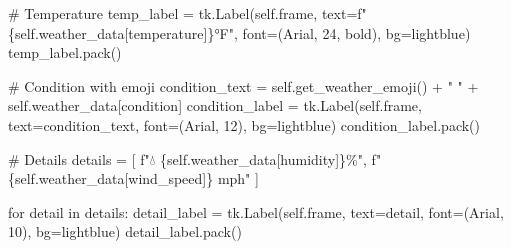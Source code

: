 \documentclass[
  letterpaper,
  DIV=11,
  numbers=noendperiod,
  oneside]{scrreprt}
\newenvironment{Shaded}{}{}
\newcommand{\CommentTok}[1]{\textcolor[rgb]{0.42,0.45,0.49}{#1}}
\newcommand{\ControlFlowTok}[1]{\textcolor[rgb]{0.84,0.23,0.29}{#1}}
\newcommand{\DecValTok}[1]{\textcolor[rgb]{0.00,0.36,0.77}{#1}}
\newcommand{\KeywordTok}[1]{\textcolor[rgb]{0.84,0.23,0.29}{#1}}
\newcommand{\NormalTok}[1]{\textcolor[rgb]{0.14,0.16,0.18}{#1}}
\newcommand{\OperatorTok}[1]{\textcolor[rgb]{0.14,0.16,0.18}{#1}}
\newcommand{\SpecialCharTok}[1]{\textcolor[rgb]{0.00,0.36,0.77}{#1}}
\newcommand{\SpecialStringTok}[1]{\textcolor[rgb]{0.01,0.18,0.38}{#1}}
\newcommand{\StringTok}[1]{\textcolor[rgb]{0.01,0.18,0.38}{#1}}
\newcommand{\VariableTok}[1]{\textcolor[rgb]{0.89,0.38,0.04}{#1}}
\begin{document}
\begin{Shaded}
\begin{Highlighting}[]
        \CommentTok{\# Temperature}
\NormalTok{        temp\_label }\OperatorTok{=}\NormalTok{ tk.Label(}\VariableTok{self}\NormalTok{.frame,}
\NormalTok{                             text}\OperatorTok{=}\SpecialStringTok{f"}\SpecialCharTok{\{}\VariableTok{self}\SpecialCharTok{.}\NormalTok{weather\_data[}\StringTok{\textquotesingle{}temperature\textquotesingle{}}\NormalTok{]}\SpecialCharTok{\}}\SpecialStringTok{°F"}\NormalTok{,}
\NormalTok{                             font}\OperatorTok{=}\NormalTok{(}\StringTok{\textquotesingle{}Arial\textquotesingle{}}\NormalTok{, }\DecValTok{24}\NormalTok{, }\StringTok{\textquotesingle{}bold\textquotesingle{}}\NormalTok{),}
\NormalTok{                             bg}\OperatorTok{=}\StringTok{\textquotesingle{}lightblue\textquotesingle{}}\NormalTok{)}
\NormalTok{        temp\_label.pack()}
        
        \CommentTok{\# Condition with emoji}
\NormalTok{        condition\_text }\OperatorTok{=} \VariableTok{self}\NormalTok{.get\_weather\_emoji() }\OperatorTok{+} \StringTok{" "} \OperatorTok{+} \VariableTok{self}\NormalTok{.weather\_data[}\StringTok{\textquotesingle{}condition\textquotesingle{}}\NormalTok{]}
\NormalTok{        condition\_label }\OperatorTok{=}\NormalTok{ tk.Label(}\VariableTok{self}\NormalTok{.frame, text}\OperatorTok{=}\NormalTok{condition\_text,}
\NormalTok{                                  font}\OperatorTok{=}\NormalTok{(}\StringTok{\textquotesingle{}Arial\textquotesingle{}}\NormalTok{, }\DecValTok{12}\NormalTok{), bg}\OperatorTok{=}\StringTok{\textquotesingle{}lightblue\textquotesingle{}}\NormalTok{)}
\NormalTok{        condition\_label.pack()}
        
        \CommentTok{\# Details}
\NormalTok{        details }\OperatorTok{=}\NormalTok{ [}
            \SpecialStringTok{f"💧 }\SpecialCharTok{\{}\VariableTok{self}\SpecialCharTok{.}\NormalTok{weather\_data[}\StringTok{\textquotesingle{}humidity\textquotesingle{}}\NormalTok{]}\SpecialCharTok{\}}\SpecialStringTok{\%"}\NormalTok{,}
            \SpecialStringTok{f"💨 }\SpecialCharTok{\{}\VariableTok{self}\SpecialCharTok{.}\NormalTok{weather\_data[}\StringTok{\textquotesingle{}wind\_speed\textquotesingle{}}\NormalTok{]}\SpecialCharTok{\}}\SpecialStringTok{ mph"}
\NormalTok{        ]}
        
        \ControlFlowTok{for}\NormalTok{ detail }\KeywordTok{in}\NormalTok{ details:}
\NormalTok{            detail\_label }\OperatorTok{=}\NormalTok{ tk.Label(}\VariableTok{self}\NormalTok{.frame, text}\OperatorTok{=}\NormalTok{detail, }
\NormalTok{                                   font}\OperatorTok{=}\NormalTok{(}\StringTok{\textquotesingle{}Arial\textquotesingle{}}\NormalTok{, }\DecValTok{10}\NormalTok{), bg}\OperatorTok{=}\StringTok{\textquotesingle{}lightblue\textquotesingle{}}\NormalTok{)}
\NormalTok{            detail\_label.pack()}
        

\end{Highlighting}
\end{Shaded}
\end{document}
